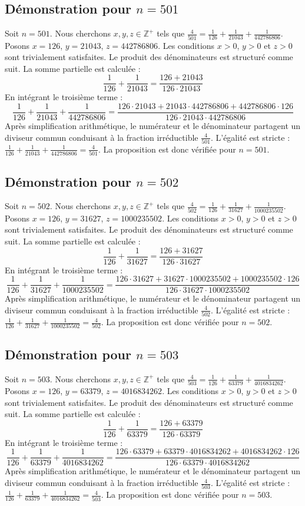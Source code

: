 \documentclass[11pt,a4paper]{article}
\begin{document}
\subsection{Démonstration pour $n = 501$}
Soit $n = 501$. Nous cherchons $x, y, z \in \mathbb{Z}^{+}$ tels que $\frac{4}{501} = \frac{1}{126} + \frac{1}{21043} + \frac{1}{442786806}$.
Posons $x = 126$, $y = 21043$, $z = 442786806$.
Les conditions $x > 0$, $y > 0$ et $z > 0$ sont trivialement satisfaites.
Le produit des dénominateurs est structuré comme suit. La somme partielle est calculée :
$$ \frac{1}{126} + \frac{1}{21043} = \frac{126+21043}{126 \cdot 21043} $$
En intégrant le troisième terme :
$$ \frac{1}{126} + \frac{1}{21043} + \frac{1}{442786806} = \frac{126 \cdot 21043 + 21043 \cdot 442786806 + 442786806 \cdot 126}{126 \cdot 21043 \cdot 442786806} $$
Après simplification arithmétique, le numérateur et le dénominateur partagent un diviseur commun conduisant à la fraction irréductible $\frac{4}{501}$.
L'égalité est stricte : $\frac{1}{126} + \frac{1}{21043} + \frac{1}{442786806} = \frac{4}{501}$.
La proposition est donc vérifiée pour $n = 501$.
\subsection{Démonstration pour $n = 502$}
Soit $n = 502$. Nous cherchons $x, y, z \in \mathbb{Z}^{+}$ tels que $\frac{4}{502} = \frac{1}{126} + \frac{1}{31627} + \frac{1}{1000235502}$.
Posons $x = 126$, $y = 31627$, $z = 1000235502$.
Les conditions $x > 0$, $y > 0$ et $z > 0$ sont trivialement satisfaites.
Le produit des dénominateurs est structuré comme suit. La somme partielle est calculée :
$$ \frac{1}{126} + \frac{1}{31627} = \frac{126+31627}{126 \cdot 31627} $$
En intégrant le troisième terme :
$$ \frac{1}{126} + \frac{1}{31627} + \frac{1}{1000235502} = \frac{126 \cdot 31627 + 31627 \cdot 1000235502 + 1000235502 \cdot 126}{126 \cdot 31627 \cdot 1000235502} $$
Après simplification arithmétique, le numérateur et le dénominateur partagent un diviseur commun conduisant à la fraction irréductible $\frac{4}{502}$.
L'égalité est stricte : $\frac{1}{126} + \frac{1}{31627} + \frac{1}{1000235502} = \frac{4}{502}$.
La proposition est donc vérifiée pour $n = 502$.
\subsection{Démonstration pour $n = 503$}
Soit $n = 503$. Nous cherchons $x, y, z \in \mathbb{Z}^{+}$ tels que $\frac{4}{503} = \frac{1}{126} + \frac{1}{63379} + \frac{1}{4016834262}$.
Posons $x = 126$, $y = 63379$, $z = 4016834262$.
Les conditions $x > 0$, $y > 0$ et $z > 0$ sont trivialement satisfaites.
Le produit des dénominateurs est structuré comme suit. La somme partielle est calculée :
$$ \frac{1}{126} + \frac{1}{63379} = \frac{126+63379}{126 \cdot 63379} $$
En intégrant le troisième terme :
$$ \frac{1}{126} + \frac{1}{63379} + \frac{1}{4016834262} = \frac{126 \cdot 63379 + 63379 \cdot 4016834262 + 4016834262 \cdot 126}{126 \cdot 63379 \cdot 4016834262} $$
Après simplification arithmétique, le numérateur et le dénominateur partagent un diviseur commun conduisant à la fraction irréductible $\frac{4}{503}$.
L'égalité est stricte : $\frac{1}{126} + \frac{1}{63379} + \frac{1}{4016834262} = \frac{4}{503}$.
La proposition est donc vérifiée pour $n = 503$.
\end{document}
